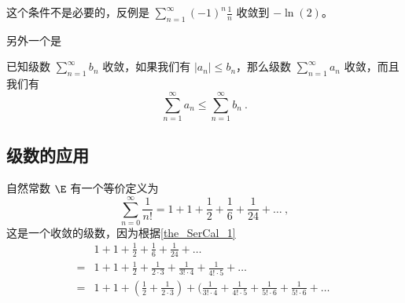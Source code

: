 这个条件不是必要的，反例是 $\sum_{n = 1}^\infty (-1)^n\frac1{n}$ 收敛到 $-\ln(2)$。

另外一个是
\begin{theorem}{}\label{the_SerCal_1}
已知级数 $\sum_{n=1}^\infty b_n$ 收敛，如果我们有 $|a_n| \leq b_n$，那么级数 $\sum_{n=1}^\infty a_n$ 收敛，而且我们有
$$
\sum_{n=1}^\infty a_n \leq \sum_{n=1}^\infty b_n ~.
$$
\end{theorem}




\subsection{级数的应用}



自然常数 $\E$ 有一个等价定义为
\begin{equation}
\sum_{n=0}^\infty \frac{1}{n!} = 1 + 1 + \frac{1}{2} + \frac{1}{6} + \frac{1}{24} + \dots~,
\end{equation}
这是一个收敛的级数，因为根据\autoref{the_SerCal_1} 
$$
\begin{aligned}
\phantom{=}& 1 + 1 + \frac{1}{2} + \frac{1}{6} + \frac{1}{24} + \dots \\
=& 1 + 1 + \frac{1}{2} + \frac{1}{2 \cdot 3} + \frac{1}{3! \cdot 4} + \frac{1}{4! \cdot 5} + \dots \\
=& 1 + 1 + (\frac{1}{2} + \frac{1}{2 \cdot 3}) + (\frac{1}{3! \cdot 4} + \frac{1}{4! \cdot 5} + \frac{1}{5! \cdot 6} + \frac{1}{5! \cdot 6} + \dots
\end{aligned}~
$$

